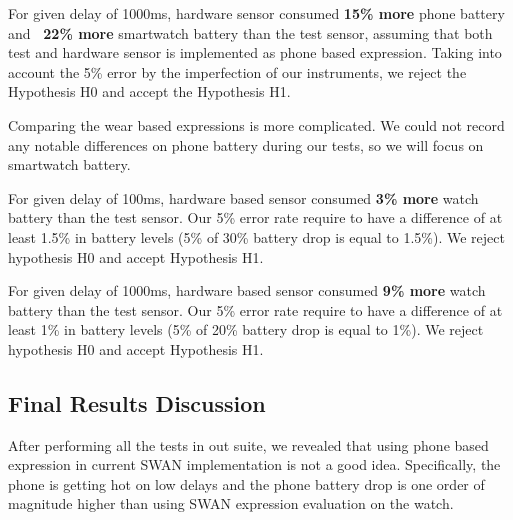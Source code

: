 For given delay of 1000ms, hardware sensor consumed \textbf{15\% more} phone battery and \textbf{~22\% more } smartwatch battery than the test sensor, assuming that both test and hardware
sensor is implemented as phone based expression.
Taking into account the 5\% error by the imperfection of our instruments, we reject the Hypothesis H0 and accept the Hypothesis H1.

Comparing the wear based expressions is more complicated. We could not record any notable differences on phone battery during our tests, so we will focus on smartwatch battery.

For given delay of 100ms,  hardware based sensor consumed \textbf{3\% more} watch battery than the test sensor.
Our 5\% error rate require to have a difference of at least 1.5\% in battery levels (5\% of 30\% battery drop is equal to 1.5\%). We
reject hypothesis H0 and accept Hypothesis H1.

For given delay of 1000ms,  hardware based sensor consumed \textbf{9\% more} watch battery than the test sensor.
Our 5\% error rate require to have a difference of at least 1\% in battery levels (5\% of 20\% battery drop is equal to 1\%). We
reject hypothesis H0 and accept Hypothesis H1.

\subsection{Final Results Discussion}

After performing all the tests in out suite, we revealed that using phone based expression in current SWAN implementation is not a good idea.
Specifically, the phone is getting hot on low delays and the phone battery drop is one order of magnitude higher than using SWAN expression evaluation on the watch.

